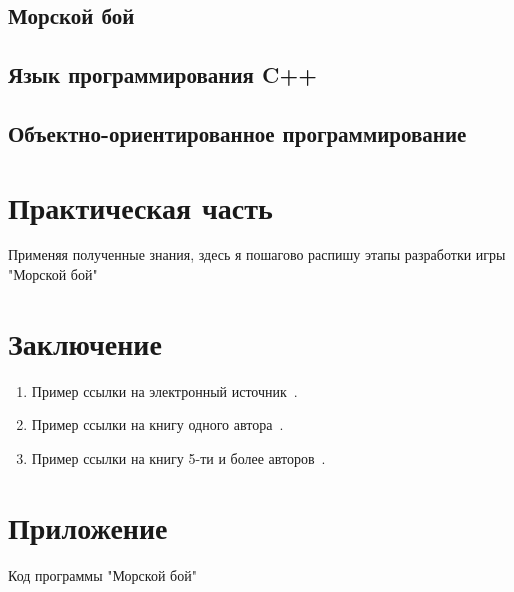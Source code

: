 \documentclass[14pt, oneside]{altsu-report}
\begin{document}
\section{Морской бой}
\section{Язык программирования C++}
\section{Объектно-ориентированное программирование}

\chapter{Практическая часть}
Применяя полученные знания, здесь я пошагово распишу этапы разработки игры "Морской бой"


\chapter*{Заключение}

\begin{enumerate}
\item Пример ссылки на электронный источник~\cite{wikiC++, wikiRUООП, wikiRUImGui, wikiSeaBattle, wikiRUGeany}.
\item Пример ссылки на книгу одного автора~\cite{book1author}.
\item Пример ссылки на книгу 5-ти и более авторов~\cite{book5author}.
\end{enumerate}

\newpage
{}
\printbibliography[title={Список использованной литературы}]

\appendix
\newpage
\chapter*{\raggedleft\label{appendix1}Приложение}

\begin{center}
\label{code:appendix}Код программы "Морской бой"
\end{center}
\end{document}
